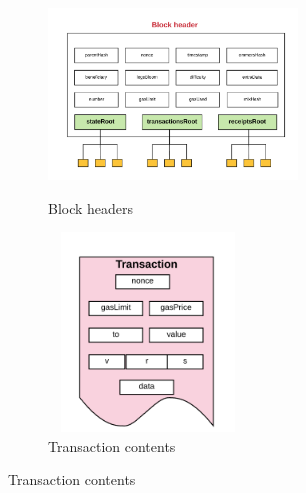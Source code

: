 \begin{figure}[!ht]
\caption{Information in the Blockchain}
\begin{subfigure}{.5\textwidth}
\centering
\includegraphics[width=250px, height=200px]{figures/block-headers.png}
\caption{Block headers \cite{preethi}}
\label{blocks}
\end{subfigure}
\begin{subfigure}{.5\textwidth}
\centering
\includegraphics[width=200px, height=200px]{figures/transaction-contents.png}
\caption{Transaction contents \cite{preethi}}
\label{transactions}
\end{subfigure}
\end{figure}


